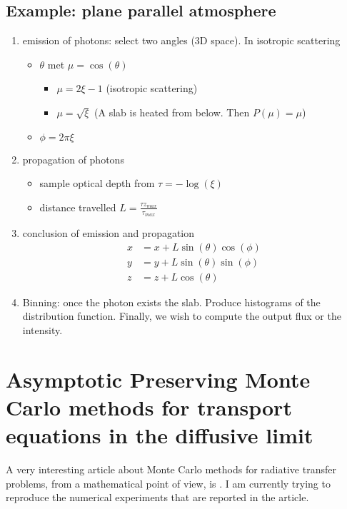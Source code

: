 \documentclass[../main/main.tex]{subfiles}
\begin{document}
\subsection{Example: plane parallel atmosphere}
\begin{enumerate}

\item emission of photons: select two angles (3D space). In isotropic scattering
\begin{itemize}
\item $\theta$ met $\mu = \cos(\theta)$
	\begin{itemize}
	\item $\mu = 2\xi -1$ (isotropic scattering)
	\item $\mu = \sqrt{\xi}$ (A slab is heated from below. Then $P(\mu) = \mu$)
	\end{itemize}
\item $\phi = 2 \pi \xi$
\end{itemize}

\item propagation of photons
\begin{itemize}
\item sample optical depth from $\tau = -\log(\xi)$
\item distance travelled $L = \frac{\tau z_{max}}{\tau_{max}}$
\end{itemize}

\item conclusion of emission and propagation
\begin{equation}
\begin{aligned}
x &= x + L \sin(\theta) \cos(\phi) \\
y &= y + L \sin(\theta) \sin(\phi) \\
z &= z + L \cos(\theta)
\end{aligned}
\end{equation}

\item Binning: once the photon exists the slab. Produce histograms of the distribution function. Finally, we wish to compute the output flux or the intensity.
\end{enumerate}

\newpage
\section{Asymptotic Preserving Monte Carlo methods for transport equations in the diffusive limit}
A very interesting article about Monte Carlo methods for radiative transfer problems, from a mathematical point of view, is \cite{Dimarco2018}. I am currently trying to reproduce the numerical experiments that are reported in the article. 
\end{document}
